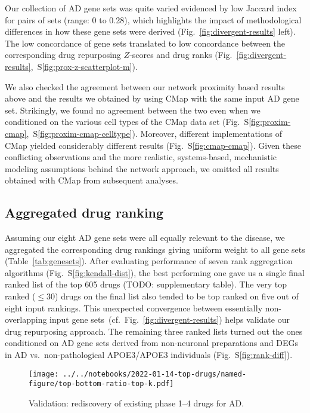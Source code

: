 \documentclass[letterpaper]{article}
\begin{document}
Our collection of AD gene sets was quite varied evidenced by low Jaccard index
for pairs of sets (range: 0 to 0.28), which
highlights the impact of methodological differences in how these gene sets
were derived (Fig.~\ref{fig:divergent-results} left). The low concordance of
gene sets translated to low concordance between the corresponding drug
repurposing $Z$-scores and drug ranks
(Fig.~\ref{fig:divergent-results},~S\ref{fig:prox-z-scatterplot-m}).

We also checked the agreement between our network proximity based results
above and the results we obtained by using CMap with the same input AD gene
set.  Strikingly, we found no agreement between the two even when we
conditioned on the various cell types of the CMap data set
(Fig.~S\ref{fig:proxim-cmap},~S\ref{fig:proxim-cmap-celltype}).  Moreover,
different implementations of CMap yielded considerably different results
(Fig.~S\ref{fig:cmap-cmap}).  Given these conflicting observations and the more realistic,
systems-based, mechanistic modeling assumptions behind the network approach,
we omitted all results obtained with CMap from subsequent analyses.

\subsection{Aggregated drug ranking}

Assuming our eight AD gene sets were all equally relevant to the disease, we
aggregated the corresponding drug rankings giving uniform weight to all gene
sets (Table~\ref{tab:genesets}).  After evaluating performance of seven rank
aggregation algorithms (Fig.~S\ref{fig:kendall-dist}), the best performing one
gave us a single final ranked list of the top 605 drugs (TODO: supplementary table).
The very top ranked ($\le 30$) drugs on the final list also tended to be top ranked
on five out of eight input rankings.  This unexpected convergence between
essentially non-overlapping input gene
sets~(cf.~Fig.~\ref{fig:divergent-results}) helps validate our drug repurposing approach.
The remaining three ranked lists turned out the ones
conditioned on AD gene sets derived from non-neuronal preparations and DEGs in
AD vs.~non-pathological APOE3/APOE3 individuals (Fig.~S\ref{fig:rank-diff}).

\begin{figure}
\texttt{[image: ../../notebooks/2022-01-14-top-drugs/named-figure/top-bottom-ratio-top-k.pdf]}
\caption{
Validation: rediscovery of existing phase 1--4 drugs for AD.
}
\label{fig:ad-drug-rediscovery}
\end{figure}
\end{document}
